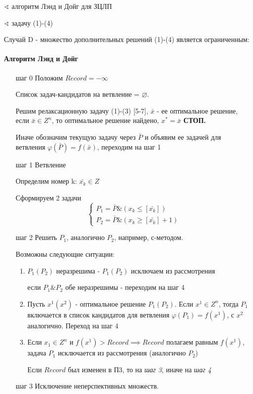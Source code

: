 \documentclass[a4paper]{article}
\theoremstyle{definition}
\theoremstyle{remark}
\begin{document}
$\sphericalangle $  алгоритм Лэнд и Дойг для ЗЦЛП

$\sphericalangle $ задачу (1)-(4)

Случай D - множество дополнительных решений (1)-(4) является ограниченным:
\paragraph*{Алгоритм Лэнд и Дойг}
\begin{enumerate}
    \item [шаг 0] Положим $Record = -\infty$

    Список задач-кандидатов на ветвление = $\varnothing$.

    Решим релаксационную задачу (1)-(3) [5-7], $\bar{x}$ - ее оптимальное решение, если $\bar{x} \in Z^n$, то оптимальное решение найдено, $x^* = \bar{x}$ \textbf{СТОП.}

    Иначе обозначим текущую задачу через $\bar{P}$ и объявим ее задачей для ветвления $\varphi(\bar{P}) = f (\bar{x})$, переходим на шаг 1
    \item [шаг 1]  Ветвление

    Определим номер k: $\bar{x_k}\in Z$

    Сформируем 2 задачи \[\begin{cases}
        P_1 = \bar{P}\& (x_k \le [\bar{x_k}])\\
        P_2 = \bar{P}\& (x_k \ge [\bar{x_k}]+1)
    \end{cases}\]

    \item [шаг 2] Решить $P_1$, аналогично $P_2$, например, с-методом.

    Возможны следующие ситуации:
    \begin{enumerate}
        \item $P_1(P_2)$ неразрешима - $P_1(P_2)$ исключаем из рассмотрения

        если $P_1 \& P_2$ обе неразрешимы - переходим на шаг 4
        \item Пусть $x^1 (x^2)$ - оптимальное решение $P_1(P_2)$. Если $x^1 \in Z^n$, тогда $P_1$ включается в список кандидатов для ветвления $\varphi(P_1) = f(x^1)$, с $x^2$ аналогично.
        Переход на шаг 4
        \item Если $x_1\in Z^n$ и $f(x^1)> Record\implies Record$ полагаем равным $f(x^1)$, задача $P_1$ исключается из рассмотрения (аналогично $P_2$)
        
        Если $Record$ был изменен в П3, то на \textit{шаг 3}, иначе на \textit{шаг 4}
    \end{enumerate}
    \item [шаг 3]
    Исключение неперспективных множеств.


\end{enumerate}
\end{document}
